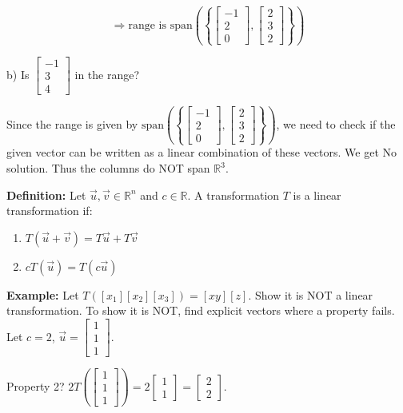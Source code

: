 \documentclass{article}
\begin{document}
\[
\Rightarrow \text{range is } \text{span}\left( \left\{ \begin{bmatrix} -1 \\ 2 \\ 0 \end{bmatrix}, \begin{bmatrix} 2 \\ 3 \\ 2 \end{bmatrix} \right\} \right)
\]

b) Is \(\begin{bmatrix} -1 \\ 3 \\ 4 \end{bmatrix}\) in the range?

Since the range is given by \(\text{span}\left( \left\{ \begin{bmatrix} -1 \\ 2 \\ 0 \end{bmatrix}, \begin{bmatrix} 2 \\ 3 \\ 2 \end{bmatrix} \right\} \right)\), we need to check if the given vector can be written as a linear combination of these vectors. We get No solution. Thus the columns do NOT span \(\mathbb{R}^3\).


\textbf{Definition:} Let $\vec{u}, \vec{v} \in \mathbb{R}^n$ and $c \in \mathbb{R}$. A transformation $T$ is a linear transformation if:
\begin{enumerate}
    \item $T(\vec{u} + \vec{v}) = T\vec{u} + T\vec{v}$
    \item $cT(\vec{u}) = T(c\vec{u})$
\end{enumerate}

\textbf{Example:} Let $T([x_1][x_2][x_3]) = [xy][z]$. Show it is NOT a linear transformation. To show it is NOT, find explicit vectors where a property fails. Let $c = 2$, $\vec{u} = \begin{bmatrix} 1 \\ 1 \\ 1 \end{bmatrix}$.

Property 2? $2T\left(\begin{bmatrix} 1 \\ 1 \\ 1 \end{bmatrix}\right) = 2\begin{bmatrix} 1 \\ 1 \end{bmatrix} = \begin{bmatrix} 2 \\ 2 \end{bmatrix}$.
\end{document}
